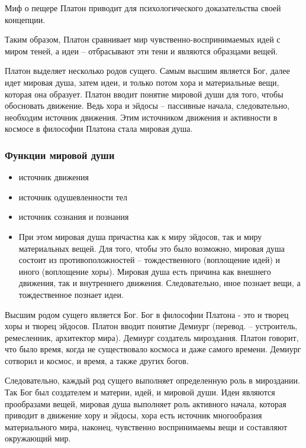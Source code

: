 \documentclass[a4paper, 14pt]{extreport}
\begin{document}
Миф о пещере Платон приводит для психологического доказательства своей
концепции.

Таким образом, Платон сравнивает мир чувственно-воспринимаемых идей с
миром теней, а идеи -- отбрасывают эти тени и являются образцами вещей.

Платон выделяет несколько родов сущего. Самым высшим является Бог, далее
идет мировая душа, затем идеи, и только потом хора и материальные вещи,
которая она образует. Платон вводит понятие мировой души для того, чтобы
обосновать движение. Ведь хора и эйдосы -- пассивные начала,
следовательно, необходим источник движения. Этим источником движения и
активности в космосе в философии Платона стала мировая душа.

\subsubsection{Функции мировой души}

\begin{itemize}

\item
  источник движения
\item
  источник одушевленности тел
\item
  источник сознания и познания
\item
  При этом мировая душа причастна как к миру эйдосов, так и миру
  материальных вещей. Для того, чтобы это было возможно, мировая душа
  состоит из противоположностей -- тождественного (воплощение идей) и
  иного (воплощение хоры). Мировая душа есть причина как внешнего
  движения, так и внутреннего движения. Следовательно, иное познает
  вещи, а тождественное познает идеи.
\end{itemize}

Высшим родом сущего является Бог. Бог в философии Платона - это и творец
хоры и творец эйдосов. Платон вводит понятие Демиург (перевод. --
устроитель, ремесленник, архитектор мира). Демиург создатель мироздания.
Платон говорит, что было время, когда не существовало космоса и даже
самого времени. Демиург сотворил и космос, и время, а также других
богов.

Следовательно, каждый род сущего выполняет определенную роль в
мироздании. Так Бог был создателем и материи, идей, и мировой души. Идеи
являются прообразами вещей, мировая душа выполняет роль активного
начала, которая приводит в движение хору и эйдосы, хора есть источник
многообразия материального мира, наконец, чувственно воспринимаемы вещи
и составляют окружающий мир.
\end{document}
